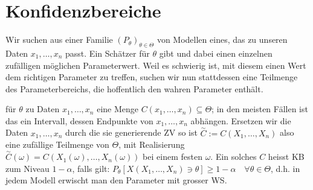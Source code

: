 
\section{Konfidenzbereiche}
Wir suchen aus einer Familie $(P_\theta)_{\theta \in \Theta}$ von Modellen eines, das zu unseren Daten $x_1, \dots, x_n$ passt. Ein Schätzer für $\theta$ gibt und dabei einen einzelnen zufälligen möglichen Parameterwert. Weil es schwierig ist, mit diesem einen Wert dem richtigen Parameter zu treffen, suchen wir nun stattdessen eine Teilmenge des Parameterbereichs, die hoffentlich den wahren Parameter enthält.
\begin{itemize}
     für $\theta$ zu Daten $x_1, \dots, x_n$ eine Menge $C(x_1, \dots, x_n) \subseteq \Theta$; in den meisten Fällen ist das ein Intervall, dessen Endpunkte von $x_1, \dots, x_n$ abhängen. Ersetzen wir die Daten $x_1, \dots, x_n$ durch die sie generierende ZV so ist $\overset{\sim}{C} := C(X_1, \dots, X_n)$ also eine zufällige Teilmenge von $\Theta$, mit Realisierung $\overset{\sim}{C}(\omega) = C(X_1(\omega), \dots, X_n(\omega))$ bei einem festen $\omega$. Ein solches $C$ heisst KB zum Niveau $1 - \alpha$, falls gilt: $P_\theta[X(X_1, \dots, X_n) \ni \theta] \ge 1 - \alpha \quad \forall \theta \in \Theta$, d.h. in jedem Modell erwischt man den Parameter mit grosser WS.
\end{itemize}

